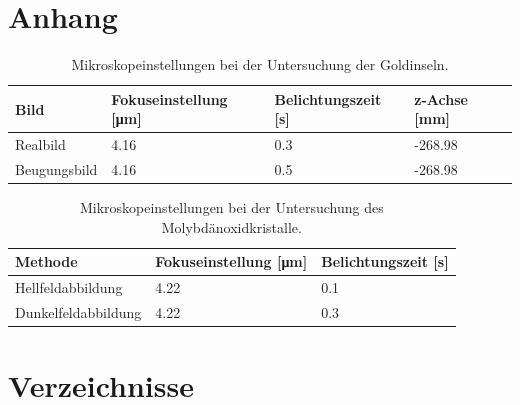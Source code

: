\documentclass[slug=TEM, room=IFW, supervisor=?, coursedate=23.\ 01.\ 2020]{../../Lab_Report_LaTeX/lab_report}
\begin{document}
\section{Anhang}
\label{sec:anhang}

\begin{table}[h!]
	\centering
	\begin{tabular}{l|l|l|l}
		\toprule
		Bild & Fokuseinstellung [\si{\micro\metre}] & Belichtungszeit [\si{\second}] & z-Achse 	[\si{\milli\metre}]\\
		\midrule
		Realbild & 4.16 & 0.3 & -268.98\\
		Beugungsbild & 4.16 & 0.5 & -268.98
	\end{tabular}
	\caption{Mikroskopeinstellungen bei der Untersuchung der Goldinseln.}
	\label{tab:gold}
\end{table}

\begin{table}[h!]
	\centering
	\begin{tabular}{l|l|l}
	\toprule
	Methode & Fokuseinstellung [\si{\micro\metre}] & Belichtungszeit [\si{\second}]\\
	\midrule
	Hellfeldabbildung & 4.22 & 0.1\\
	Dunkelfeldabbildung & 4.22 & 0.3
	\end{tabular}
	\caption{Mikroskopeinstellungen bei der Untersuchung des Molybdänoxidkristalle.}
	\label{tab:molybdaen}
\end{table}

\newpage
\section{Verzeichnisse}
\label{sec:literatur}

\listoffigures

\listoftables

\printbibliography
\end{document}
